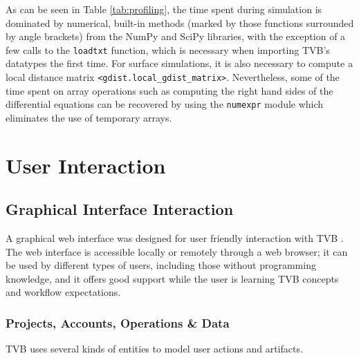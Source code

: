 \documentclass{bioinfo}
\begin{document}
	As can be seen in Table \ref{tab:profiling}, the time spent during simulation
	is dominated by numerical, built-in methods (marked by those functions surrounded by angle
	brackets) from the NumPy and SciPy libraries, with the exception of a few
	calls to the \texttt{loadtxt} function, which is necessary when importing TVB's
	datatypes the first time. For surface simulations, it is also necessary to compute
	a local distance matrix \texttt{<gdist.local\_gdist\_matrix>}. Nevertheless, 
	some of the time spent on array operations such as computing the right hand sides 
	of the differential equations can be 
	recovered by using the \texttt{numexpr} module which eliminates the 
	use of temporary arrays. 

\section{User Interaction}

\subsection{Graphical Interface Interaction}

		A graphical web interface was designed for user friendly
		interaction with TVB . The web interface is accessible locally or
		remotely through a web browser; it can be used by different types of
		users, including those without programming knowledge, and it offers
		good support while the user is learning TVB concepts and workflow
		expectations.  

		\subsubsection{Projects, Accounts, Operations \& Data}

		TVB uses several kinds of entities to model user actions
        and artifacts.
\end{document}
